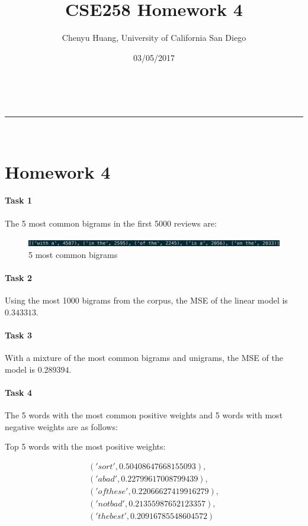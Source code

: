 \documentclass[a4paper,11pt]{article}
\makeatletter
\newcommand{\linia}{\rule{\linewidth}{0.5pt}}
\theoremstyle{mytheor}
\renewcommand{\maketitle}{
\begin{center}
\vspace{2ex}
{\huge \textsc{\@title}}
\vspace{1ex}
\\
\linia\\
\@author \hfill \@date
\vspace{4ex}
\end{center}
}
\makeatother
\begin{document}
\title{CSE258 Homework 4}

\author{Chenyu Huang, University of California San Diego}

\date{03/05/2017}

\maketitle

\section{Homework 4}

\paragraph{Task 1}

The 5 most common bigrams in the first 5000 reviews are:

\begin{figure}[h]
    \centering
    \includegraphics[width=16cm]{p1}
    \caption{5 most common bigrams}
\end{figure}
 
\paragraph{Task 2}

Using the most 1000 bigrams from the corpus, the MSE of the linear model is $0.343313$.

\paragraph{Task 3}

With a mixture of the most common bigrams and unigrams, the MSE of the model is $0.289394$.

\paragraph{Task 4}

The 5 words with the most common positive weights and 5 words with most negative weights are as follows:

Top 5 words with the most positive weights:

\begin{align}
('sort', 0.50408647668155093),\\ ('a bad', 0.22799617008799439), \\('of these', 0.22066627419916279), \\('not bad', 0.21355987652123357), \\('the best', 0.20916785548604572)
\end{align}
\end{document}

